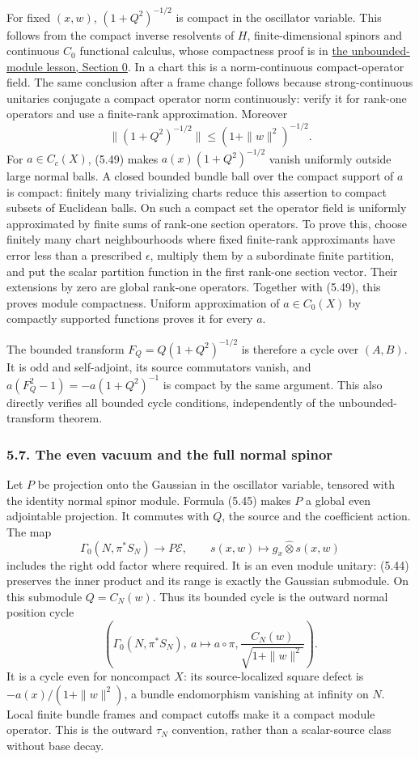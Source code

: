\documentclass[
  11pt,
]{article}
\begin{document}
For fixed \((x,w)\), \((1+Q^2)^{-1/2}\) is compact in the oscillator
variable. This follows from the compact inverse resolvents of \(H\),
finite-dimensional spinors and continuous \(C_0\) functional calculus,
whose compactness proof is in
\href{KT-KK-11.html\#0-regular-calculus-localization-and-compact-supports}{the
unbounded-module lesson, Section 0}. In a chart this is a
norm-continuous compact-operator field. The same conclusion after a
frame change follows because strong-continuous unitaries conjugate a
compact operator norm continuously: verify it for rank-one operators and
use a finite-rank approximation. Moreover \[
\|(1+Q^2)^{-1/2}\|
\leq(1+\|w\|^2)^{-1/2}.
\tag{5.49}
\] For \(a\in C_c(X)\), (5.49) makes \(a(x)(1+Q^2)^{-1/2}\) vanish
uniformly outside large normal balls. A closed bounded bundle ball over
the compact support of \(a\) is compact: finitely many trivializing
charts reduce this assertion to compact subsets of Euclidean balls. On
such a compact set the operator field is uniformly approximated by
finite sums of rank-one section operators. To prove this, choose
finitely many chart neighbourhoods where fixed finite-rank approximants
have error less than a prescribed \(\epsilon\), multiply them by a
subordinate finite partition, and put the scalar partition function in
the first rank-one section vector. Their extensions by zero are global
rank-one operators. Together with (5.49), this proves module
compactness. Uniform approximation of \(a\in C_0(X)\) by compactly
supported functions proves it for every \(a\).

The bounded transform \(F_Q=Q(1+Q^2)^{-1/2}\) is therefore a cycle over
\((A,B)\). It is odd and self-adjoint, its source commutators vanish,
and \(a(F_Q^2-1)=-a(1+Q^2)^{-1}\) is compact by the same argument. This
also directly verifies all bounded cycle conditions, independently of
the unbounded-transform theorem.

\subsubsection{5.7. The even vacuum and the full normal
spinor}\label{the-even-vacuum-and-the-full-normal-spinor}

Let \(P\) be projection onto the Gaussian in the oscillator variable,
tensored with the identity normal spinor module. Formula (5.45) makes
\(P\) a global even adjointable projection. It commutes with \(Q\), the
source and the coefficient action. The map \[
\Gamma_0(N,\pi^*S_N)\longrightarrow P\mathcal E,
\qquad s(x,w)\longmapsto g_x\widehat\otimes s(x,w)
\tag{5.50}
\] includes the right odd factor where required. It is an even module
unitary: (5.44) preserves the inner product and its range is exactly the
Gaussian submodule. On this submodule \(Q=C_N(w)\). Thus its bounded
cycle is the outward normal position cycle \[
\left(\Gamma_0(N,\pi^*S_N),\ a\mapsto a\circ\pi,
\frac{C_N(w)}{\sqrt{1+\|w\|^2}}\right).
\tag{5.51}
\] It is a cycle even for noncompact \(X\): its source-localized square
defect is \(-a(x)/(1+\|w\|^2)\), a bundle endomorphism vanishing at
infinity on \(N\). Local finite bundle frames and compact cutoffs make
it a compact module operator. This is the outward \(\tau_N\) convention,
rather than a scalar-source class without base decay.
\end{document}
